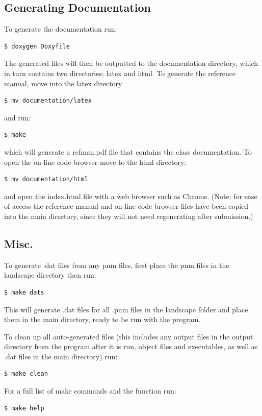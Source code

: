 \subsection{Generating Documentation}
To generate the documentation run:
\begin{lstlisting}[language=bash]
$ doxygen Doxyfile
\end{lstlisting}
The generated files will then be outputted to the documentation directory, which in turn contains two directories; latex and html. To generate the reference manual, move into the latex directory
\begin{lstlisting}[language=bash]
$ mv documentation/latex
\end{lstlisting}
and run:
\begin{lstlisting}[language=bash]
$ make
\end{lstlisting}
which will generate a refman.pdf file that contains the class documentation. To open the on-line code browser move to the html directory:
 \begin{lstlisting}[language=bash]
$ mv documentation/html
\end{lstlisting}
and open the index.html file with a web browser such as Chrome.
(Note: for ease of access the reference manual and on-line code browser files have been copied into the main directory, since they will not need regenerating after submission.)

\subsection{Misc.}
To generate .dat files from any pnm files, first place the pnm files in the landscape directory then run:

\begin{lstlisting}[language=bash]
$ make dats
\end{lstlisting}
This will generate .dat files for all .pnm files in the landscape folder and place them in the main directory, ready to be run with the program. 


To clean up all auto-generated files (this includes any output files in the output directory from the program after it is run, object files and executables, as well as .dat files in the main directory) run:
\begin{lstlisting}[language=bash]
$ make clean
\end{lstlisting}


For a full list of make commands and the function run:
\begin{lstlisting}[language=bash]
$ make help
\end{lstlisting}



